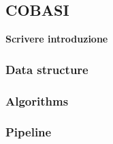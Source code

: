 \documentclass[../main.tex]{subfiles}
\begin{document}
\subsection{COBASI}

\textbf{Scrivere introduzione}

\subsubsection{Data structure}
\subsubsection{Algorithms}
\subsubsection{Pipeline}
\end{document}

